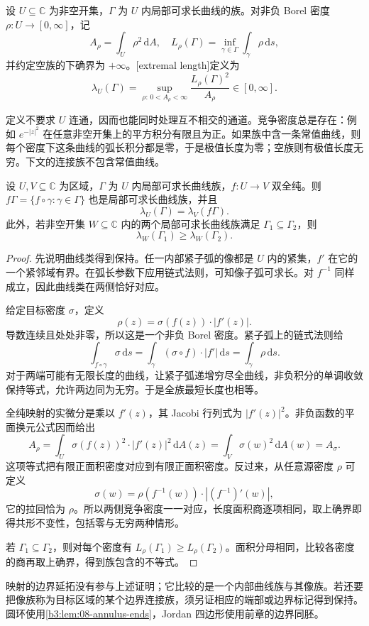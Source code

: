 \begin{definition}\label{b3:def:08-extremal-length}
设 \(U\subseteq\mathbb C\) 为非空开集，\(\Gamma\) 为 \(U\) 内局部可求长曲线的族。对非负 Borel 密度 \(\rho:U\rightarrow[0,\infty]\)，记
\[
 A_\rho=\int_U\rho^2\,\mathrm dA,\quad
 L_\rho(\Gamma)=\inf_{\gamma\in\Gamma}\int_\gamma\rho\,\mathrm ds,
\]
并约定空族的下确界为 \(+\infty\)。[extremal length]定义为
\[
 \lambda_U(\Gamma)
 =\sup_{\rho:\,0<A_\rho<\infty}
       \frac{L_\rho(\Gamma)^2}{A_\rho}\in[0,\infty].
\]
\end{definition}
定义不要求 \(U\) 连通，因而也能同时处理互不相交的通道。竞争密度总是存在：例如 \(e^{-|z|^2}\) 在任意非空开集上的平方积分有限且为正。如果族中含一条常值曲线，则每个密度下这条曲线的弧长积分都是零，于是极值长度为零；空族则有极值长度无穷。下文的连接族不包含常值曲线。

\begin{theorem}[极值长度的共形不变性与族包含]\label{b3:thm:08-extremal-conformal}
设 \(U,V\subseteq\mathbb C\) 为区域，\(\Gamma\) 为 \(U\) 内局部可求长曲线族，\(f:U\rightarrow V\) 双全纯。则 \(f\Gamma=\{f\circ\gamma:\gamma\in\Gamma\}\) 也是局部可求长曲线族，并且
\[
 \lambda_U(\Gamma)=\lambda_V(f\Gamma).
\]
此外，若非空开集 \(W\subseteq\mathbb C\) 内的两个局部可求长曲线族满足 \(\Gamma_1\subseteq\Gamma_2\)，则
\[
 \lambda_W(\Gamma_1)\ge\lambda_W(\Gamma_2).
\]
\end{theorem}
\begin{proof}
先说明曲线类得到保持。任一内部紧子弧的像都是 \(U\) 内的紧集，\(f'\) 在它的一个紧邻域有界。在弧长参数下应用链式法则，可知像子弧可求长。对 \(f^{-1}\) 同样成立，因此曲线类在两侧恰好对应。

给定目标密度 \(\sigma\)，定义
\[
 \rho(z)=\sigma(f(z))\cdot|f'(z)|.
\]
导数连续且处处非零，所以这是一个非负 Borel 密度。紧子弧上的链式法则给
\[
 \int_{f\circ\gamma}\sigma\,\mathrm ds
 =\int_\gamma(\sigma\circ f)\cdot|f'|\,\mathrm ds
 =\int_\gamma\rho\,\mathrm ds.
\]
对于两端可能有无限长度的曲线，让紧子弧递增穷尽全曲线，非负积分的单调收敛保持等式，允许两边同为无穷。于是全族最短长度也相等。

全纯映射的实微分是乘以 \(f'(z)\)，其 Jacobi 行列式为 \(|f'(z)|^2\)。非负函数的平面换元公式因而给出
\[
 A_\rho=\int_U\sigma(f(z))^2\cdot|f'(z)|^2\,\mathrm dA(z)
       =\int_V\sigma(w)^2\,\mathrm dA(w)=A_\sigma.
\]
这项等式把有限正面积密度对应到有限正面积密度。反过来，从任意源密度 \(\rho\) 可定义
\[
 \sigma(w)=\rho(f^{-1}(w))\cdot|(f^{-1})'(w)|,
\]
它的拉回恰为 \(\rho\)。所以两侧竞争密度一一对应，长度面积商逐项相同，取上确界即得共形不变性，包括零与无穷两种情形。

若 \(\Gamma_1\subseteq\Gamma_2\)，则对每个密度有
\(L_\rho(\Gamma_1)\ge L_\rho(\Gamma_2)\)。面积分母相同，比较各密度的商再取上确界，得到族包含的不等式。
\end{proof}
映射的边界延拓没有参与上述证明；它比较的是一个内部曲线族与其像族。若还要把像族称为目标区域的某个边界连接族，须另证相应的端部或边界标记得到保持。圆环使用\cref{b3:lem:08-annulus-ends}，Jordan 四边形使用前章的边界同胚。

